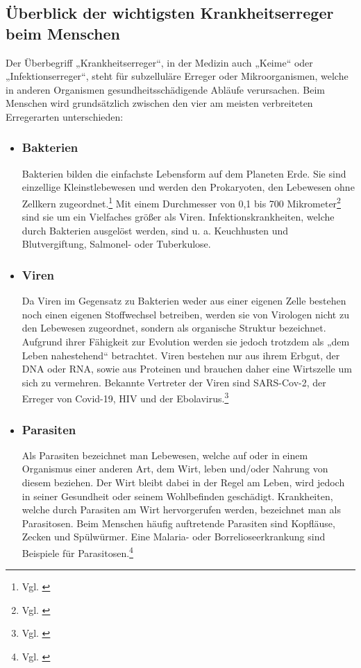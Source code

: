 \documentclass[12pt]{article}
\begin{document}
\subsection{Überblick der wichtigsten Krankheitserreger beim Menschen}
Der Überbegriff „Krankheitserreger“, in der Medizin auch „Keime“ oder „Infektionserreger“, steht für subzelluläre Erreger oder Mikroorganismen, welche in anderen Organismen gesundheitsschädigende Abläufe verursachen. Beim Menschen wird grundsätzlich zwischen den vier am meisten verbreiteten Erregerarten unterschieden:
\begin{itemize}
    \item \subsubsection{Bakterien}
    Bakterien bilden die einfachste Lebensform auf dem Planeten Erde. Sie sind einzellige Kleinstlebewesen und werden den Prokaryoten, den Lebewesen ohne Zellkern zugeordnet.\footnote{Vgl. \cite{Nagel2021}} Mit einem Durchmesser von 0,1 bis 700 Mikrometer\footnote{Vgl. \cite{BZgA2021}} sind sie um ein Vielfaches größer als Viren. Infektionskrankheiten, welche durch Bakterien ausgelöst werden, sind u. a. Keuchhusten und Blutvergiftung, Salmonel- oder Tuberkulose.
    \item \subsubsection{Viren}
    Da Viren im Gegensatz zu Bakterien weder aus einer eigenen Zelle bestehen noch einen eigenen Stoffwechsel betreiben, werden sie von Virologen nicht zu den Lebewesen zugeordnet, sondern als organische Struktur bezeichnet. Aufgrund ihrer Fähigkeit zur Evolution werden sie jedoch trotzdem als „dem Leben nahestehend“ betrachtet. Viren bestehen nur aus ihrem Erbgut, der DNA oder RNA, sowie aus Proteinen und brauchen daher eine Wirtszelle um sich zu vermehren. Bekannte Vertreter der Viren sind SARS-Cov-2, der Erreger von Covid-19, HIV und der Ebolavirus.\footnote{Vgl. \cite{Viren22}} 
    \item \subsubsection{Parasiten}
    Als Parasiten bezeichnet man Lebewesen, welche auf oder in einem Organismus einer anderen Art, dem Wirt, leben und/oder Nahrung von diesem beziehen. Der Wirt bleibt dabei in der Regel am Leben, wird jedoch in seiner Gesundheit oder seinem Wohlbefinden geschädigt. Krankheiten, welche durch Parasiten am Wirt hervorgerufen werden, bezeichnet man als Parasitosen. Beim Menschen häufig auftretende Parasiten sind Kopfläuse, Zecken und Spülwürmer. Eine Malaria- oder Borrelioseerkrankung sind Beispiele für Parasitosen.\footnote{Vgl. \cite{Paras22}}

\end{itemize}
\end{document}

